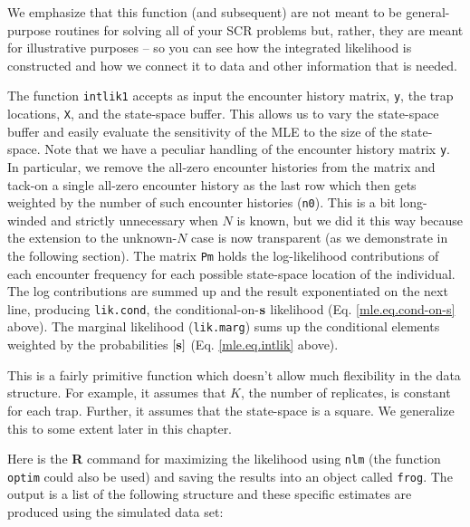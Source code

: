 We emphasize that this function (and subsequent) are not meant to be
general-purpose routines for solving all of your SCR problems but,
rather, they are meant for illustrative purposes -- so you can see how
the integrated likelihood is constructed and how we connect it to data
and other information that is needed.

The function \mbox{\tt intlik1} accepts as input the encounter history
matrix, \mbox{\tt y}, the trap locations, \mbox{\tt X}, and the
state-space buffer. This allows us to vary the state-space buffer and
easily evaluate the sensitivity of the MLE to the size of the
state-space.  Note that we have a peculiar handling of the encounter
history matrix \mbox{\tt y}. In particular, we remove the all-zero
encounter histories from the matrix and tack-on a single all-zero
encounter history as the last row which then gets weighted by the
number of such encounter histories (\mbox{\tt n0}). This is a bit
long-winded and strictly unnecessary when $N$ is known, but we did it
this way because the extension to the unknown-$N$ case is now
transparent (as we demonstrate in the following section).  The matrix
\mbox{\tt Pm} holds the log-likelihood contributions of each encounter
frequency for each possible state-space location of the individual.
The log contributions are summed up and the result exponentiated on
the next line, producing \mbox{\tt lik.cond}, the conditional-on-${\bf
  s}$ likelihood (Eq. \ref{mle.eq.cond-on-s} above). The marginal
likelihood (\mbox{\tt lik.marg}) sums up the conditional elements
weighted by the probabilities $[{\bf s}]$ (Eq. \ref{mle.eq.intlik}
above).

This is a fairly
primitive function which doesn't allow much flexibility in the data
structure. For example, it assumes that $K$, the number of replicates,
is constant for each trap. Further, it assumes that the state-space is
a square. We generalize this to some extent later in this chapter.

Here is the {\bf R} command for maximizing the likelihood using
\mbox{\tt nlm} (the function \mbox{\tt optim} could also be used) and saving the
results into an object called \mbox{\tt frog}.  The output is a list of the
following structure and these specific estimates are produced using
the simulated data set:

